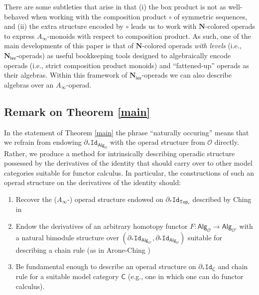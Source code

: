 \documentclass[11pt]{amsart}
\theoremstyle{definition}
\theoremstyle{remark}
\newcommand{\Alg}[1]{ {\mathsf{Alg}_{\mathcal{#1}}} }
\newcommand{\Id}{\mathtt{Id}}
\newcommand{\Cal}[1]{\mathcal{#1}}
\newcommand{\Nl}{\mathbf{N}_{\mathsf{lev}}}
\newcommand{\der}[1]{\partial_* \Id}
\begin{document}
There are some subtleties that arise in that (i) the box product is not as well-behaved when working with the composition product $\circ$ of symmetric sequences, and (ii) the extra structure encoded by $\circ$ leads us to work with $\mathbf{N}$-colored operads to express $A_{\infty}$-monoids with respect to composition product.  As such, one of the main developments of this paper is that of $\mathbf{N}$-colored operads \textit{with levels} (i.e., $\Nl$-operads) as useful bookkeeping tools designed to algebraically encode operads (i.e., strict composition product monoids) and ``fattened-up'' operads as their algebras. Within this framework of $\Nl$-operads we can also describe algebras over an $A_{\infty}$-operad. %

\subsection{Remark on Theorem \ref{main}} \label{sec:remark}
In the statement of Theorem \ref{main} the phrase ``naturally occuring'' means that we refrain from endowing $\partial_* \Id_{\Alg{O}}$ with the operad structure from $\Cal{O}$ directly. Rather, we produce a method for intrinsically describing operadic structure possessed by the derivatives of the identity that should carry over to other model categories suitable for functor calculus. In particular, the constructions of such an operad structure on the derivatives of the identity should: \begin{enumerate}[label=(\roman*)] 
\item Recover the ($A_{\infty}$-) operad structure endowed on $\partial_* \Id_{\mathsf{Top}_*}$ described by Ching in \cite{Ching-thesis} 

\item Endow the derivatives of an arbitrary homotopy functor $F\colon \Alg{O}\to \Alg{O'}$ with a natural bimodule structure over $(\partial_* \Id_{\Alg{O'}}, \partial_* \Id_{\Alg{O}})$ suitable for describing a chain rule (as in Arone-Ching \cite{AC-1})

\item Be fundamental enough to describe an operad structure on $\partial_* \Id_{\mathsf{C}}$ and chain rule for a suitable model category $\mathsf{C}$ (e.g.,  one in which one can do functor calculus).
\end{enumerate}
\end{document}
